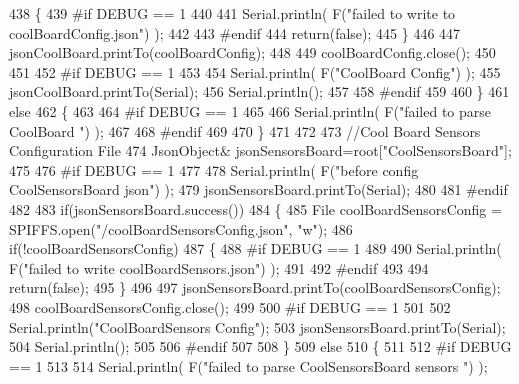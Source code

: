 \begin{DoxyCode}
438         \{   
439 \textcolor{preprocessor}{        #if DEBUG == 1}
440             
441             Serial.println( F(\textcolor{stringliteral}{"failed to write to coolBoardConfig.json"}) );
442 
443 \textcolor{preprocessor}{        #endif}
444             \textcolor{keywordflow}{return}(\textcolor{keyword}{false});
445         \}
446         
447         jsonCoolBoard.printTo(coolBoardConfig);
448         
449         coolBoardConfig.close();
450 
451 
452 \textcolor{preprocessor}{    #if DEBUG == 1}
453 
454         Serial.println( F(\textcolor{stringliteral}{"CoolBoard Config"}) );
455         jsonCoolBoard.printTo(Serial);
456         Serial.println();
457     
458 \textcolor{preprocessor}{    #endif}
459         
460     \}
461     \textcolor{keywordflow}{else}
462     \{
463     
464 \textcolor{preprocessor}{    #if DEBUG == 1 }
465 
466         Serial.println( F(\textcolor{stringliteral}{"failed to parse CoolBoard "}) );
467     
468 \textcolor{preprocessor}{    #endif}
469 
470     \}       
471 
472     
473     \textcolor{comment}{//Cool Board Sensors Configuration File}
474         JsonObject& jsonSensorsBoard=root[\textcolor{stringliteral}{"CoolSensorsBoard"}];
475 
476 \textcolor{preprocessor}{#if DEBUG == 1 }
477 
478     Serial.println( F(\textcolor{stringliteral}{"before config CoolSensorsBoard json"}) );
479     jsonSensorsBoard.printTo(Serial);
480 
481 \textcolor{preprocessor}{#endif }
482     
483     \textcolor{keywordflow}{if}(jsonSensorsBoard.success())
484     \{   
485         File coolBoardSensorsConfig = SPIFFS.open(\textcolor{stringliteral}{"/coolBoardSensorsConfig.json"}, \textcolor{stringliteral}{"w"}); 
486         \textcolor{keywordflow}{if}(!coolBoardSensorsConfig)
487         \{
488 \textcolor{preprocessor}{        #if DEBUG == 1 }
489         
490             Serial.println( F(\textcolor{stringliteral}{"failed to write coolBoardSensors.json"}) );
491 
492 \textcolor{preprocessor}{        #endif}
493 
494             \textcolor{keywordflow}{return}(\textcolor{keyword}{false});
495         \}
496         
497         jsonSensorsBoard.printTo(coolBoardSensorsConfig);
498         coolBoardSensorsConfig.close();
499 
500 \textcolor{preprocessor}{    #if DEBUG == 1}
501 
502         Serial.println(\textcolor{stringliteral}{"CoolBoardSensors Config"});
503         jsonSensorsBoard.printTo(Serial);
504         Serial.println();
505 
506 \textcolor{preprocessor}{    #endif}
507 
508     \}
509     \textcolor{keywordflow}{else}
510     \{
511 
512 \textcolor{preprocessor}{    #if DEBUG == 1}
513 
514         Serial.println( F(\textcolor{stringliteral}{"failed to parse CoolSensorsBoard sensors "}) );   

\end{DoxyCode}
